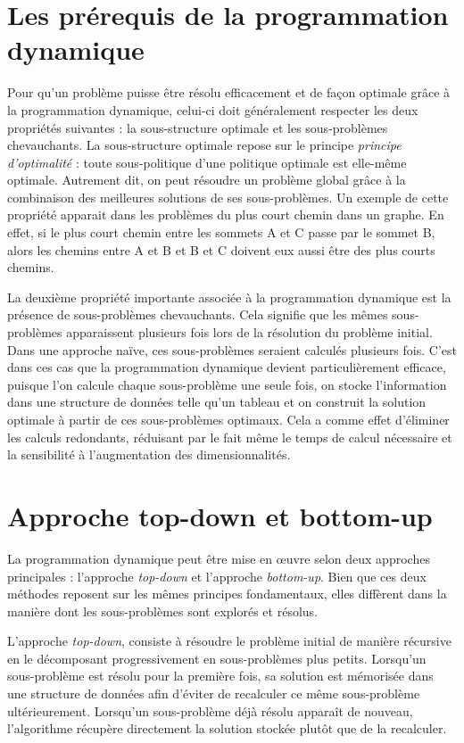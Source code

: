 \documentclass[12pt, letterpaper]{report}
\begin{document}
\section{Les prérequis de la programmation dynamique}
Pour qu'un problème puisse être résolu efficacement et de façon optimale grâce à la programmation dynamique, celui-ci doit généralement respecter les deux propriétés suivantes : la sous-structure optimale et les sous-problèmes chevauchants.  La sous-structure optimale repose sur le principe \textit{principe d'optimalité} : toute sous-politique d'une politique optimale est elle-même optimale. Autrement dit, on peut résoudre un problème global grâce à la combinaison des meilleures solutions de ses sous-problèmes.  Un exemple de cette propriété apparait dans les problèmes du plus court chemin dans un graphe.  En effet, si le plus court chemin entre les sommets A et C passe par le sommet B, alors les chemins entre A et B et B et C doivent eux aussi être des plus courts chemins.

La deuxième propriété importante associée à la programmation dynamique est la présence de sous-problèmes chevauchants.  Cela signifie que les mêmes sous-problèmes apparaissent plusieurs fois lors de la résolution du problème initial.  Dans une approche naïve, ces sous-problèmes seraient calculés plusieurs fois.  C'est dans ces cas que la programmation dynamique devient particulièrement efficace, puisque l'on calcule chaque sous-problème une seule fois, on stocke l'information dans une structure de données telle qu'un tableau et on construit la solution optimale à partir de ces sous-problèmes optimaux.  Cela a comme effet d'éliminer les calculs redondants, réduisant par le fait même le temps de calcul nécessaire et la sensibilité à l'augmentation des dimensionnalités.

\section{Approche top-down et bottom-up}

La programmation dynamique peut être mise en œuvre selon deux approches principales : l'approche \textit{top-down} et l'approche \textit{bottom-up}. Bien que ces deux méthodes reposent sur les mêmes principes fondamentaux, elles diffèrent dans la manière dont les sous-problèmes sont explorés et résolus.

L'approche \textit{top-down}, consiste à résoudre le problème initial de manière récursive en le décomposant progressivement en sous-problèmes plus petits. Lorsqu’un sous-problème est résolu pour la première fois, sa solution est mémorisée dans une structure de données afin d’éviter de recalculer ce même sous-problème ultérieurement.  Lorsqu’un sous-problème déjà résolu apparaît de nouveau, l’algorithme récupère directement la solution stockée plutôt que de la recalculer.
\end{document}
